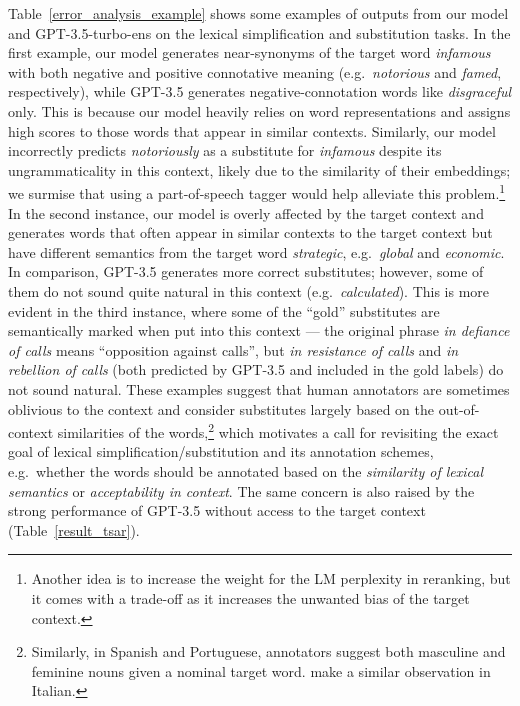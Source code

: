 \documentclass[11pt]{article}
\newcommand{\tabref}[2][]{Table#1~\ref{#2}\xspace}
\newcommand{\ex}[1]{\textit{#1}\xspace}
\begin{document}
\tabref[]{error_analysis_example} shows some examples of outputs from our model and GPT-3.5-turbo-ens on the lexical simplification and substitution tasks. In the first example, our model generates near-synonyms of the target word \ex{infamous} with both negative and positive connotative meaning (e.g.\ \ex{notorious} and \ex{famed}, respectively), while GPT-3.5 generates negative-connotation words like \ex{disgraceful} only. This is because our model heavily relies on word representations and assigns high scores to those words that appear in similar contexts. Similarly, our model incorrectly predicts \ex{notoriously} as a substitute for \ex{infamous} despite its ungrammaticality in this context, likely due to the similarity of their embeddings; we surmise that using a part-of-speech tagger would help alleviate this problem.\footnote{Another idea is to increase the weight for the LM perplexity in reranking, but it comes with a trade-off as it increases the unwanted bias of the target context.} In the second instance, our model is overly affected by the target context and generates words that often appear in similar contexts to the target context but have different semantics from the target word \ex{strategic}, e.g.\ \ex{global} and \ex{economic}. In comparison, GPT-3.5 generates more correct substitutes; however, some of them do not sound quite natural in this context (e.g.\ \ex{calculated}). This is more evident in the third instance, where some of the ``gold'' substitutes are semantically marked when put into this context --- the original phrase \ex{in defiance of calls} means ``opposition against calls'', but \ex{in resistance of calls} and \ex{in rebellion of calls} (both predicted by GPT-3.5 and included in the gold labels) do not sound natural. These examples suggest that human annotators are sometimes oblivious to the context and consider substitutes largely based on the out-of-context similarities of the words,\footnote{Similarly, in Spanish and Portuguese, annotators suggest both masculine and feminine nouns given a nominal target word. \citet{wada-etal-2022-unsupervised} make a similar observation in Italian.} which motivates a call for revisiting the exact goal of lexical simplification/substitution and its annotation schemes, e.g.\ whether the words should be annotated based on the {\it similarity of lexical semantics} or {\it acceptability in context}.  The same concern is also raised by the strong performance of GPT-3.5 without access to the target context (\tabref[]{result_tsar}).
\end{document}
